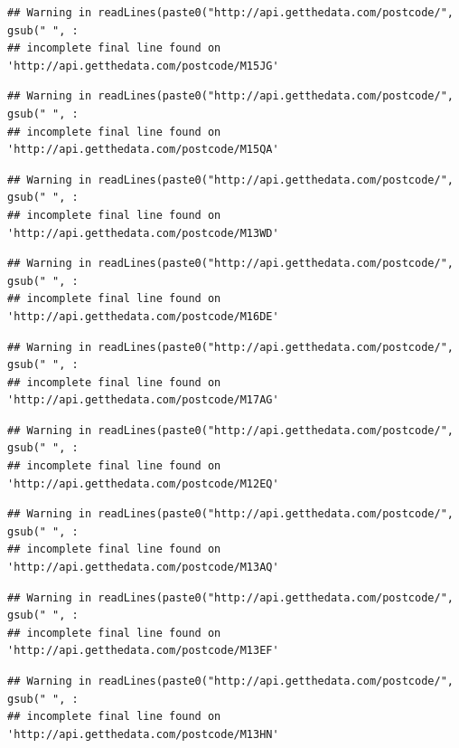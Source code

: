 \documentclass[]{book}
\begin{document}
\begin{verbatim}
## Warning in readLines(paste0("http://api.getthedata.com/postcode/", gsub(" ", :
## incomplete final line found on 'http://api.getthedata.com/postcode/M15JG'
\end{verbatim}

\begin{verbatim}
## Warning in readLines(paste0("http://api.getthedata.com/postcode/", gsub(" ", :
## incomplete final line found on 'http://api.getthedata.com/postcode/M15QA'
\end{verbatim}

\begin{verbatim}
## Warning in readLines(paste0("http://api.getthedata.com/postcode/", gsub(" ", :
## incomplete final line found on 'http://api.getthedata.com/postcode/M13WD'
\end{verbatim}

\begin{verbatim}
## Warning in readLines(paste0("http://api.getthedata.com/postcode/", gsub(" ", :
## incomplete final line found on 'http://api.getthedata.com/postcode/M16DE'
\end{verbatim}

\begin{verbatim}
## Warning in readLines(paste0("http://api.getthedata.com/postcode/", gsub(" ", :
## incomplete final line found on 'http://api.getthedata.com/postcode/M17AG'
\end{verbatim}

\begin{verbatim}
## Warning in readLines(paste0("http://api.getthedata.com/postcode/", gsub(" ", :
## incomplete final line found on 'http://api.getthedata.com/postcode/M12EQ'
\end{verbatim}

\begin{verbatim}
## Warning in readLines(paste0("http://api.getthedata.com/postcode/", gsub(" ", :
## incomplete final line found on 'http://api.getthedata.com/postcode/M13AQ'
\end{verbatim}

\begin{verbatim}
## Warning in readLines(paste0("http://api.getthedata.com/postcode/", gsub(" ", :
## incomplete final line found on 'http://api.getthedata.com/postcode/M13EF'
\end{verbatim}

\begin{verbatim}
## Warning in readLines(paste0("http://api.getthedata.com/postcode/", gsub(" ", :
## incomplete final line found on 'http://api.getthedata.com/postcode/M13HN'
\end{verbatim}
\end{document}
